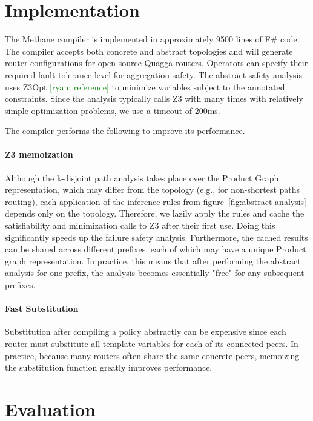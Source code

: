 \documentclass{sig-alternate-10pt}
\newcommand{\ryan}[1]{\textcolor{green}{[ryan: #1]}}
\newcommand{\sysname}{{\small \sf Methane}\xspace}
\newcommand{\para}[1]{\paragraph*{\textbf{#1}}}
\begin{document}
\section{Implementation}
\label{sec:implementation}

The \sysname compiler is implemented in approximately 9500 lines of F\# code. The compiler accepts both concrete and abstract topologies and will generate router configurations for open-source Quagga routers. Operators can specify their required fault tolerance level for aggregation safety. The abstract safety analysis uses Z3Opt \ryan{reference} to minimize variables subject to the annotated constraints. Since the analysis typically calls Z3 with many times with relatively simple optimization problems, we use a timeout of 200ms.

The compiler performs the following to improve its performance.

\para{Z3 memoization}

Although the k-disjoint path analysis takes place over the Product Graph representation, which may differ from the topology (e.g., for non-shortest paths routing), each application of the inference rules from figure~\ref{fig:abstract-analysis} depends only on the topology. Therefore, we lazily apply the rules and cache the satisfiability and minimization calls to Z3 after their first use. Doing this significantly speeds up the failure safety analysis. Furthermore, the cached results can be shared across different prefixes, each of which may have a unique Product graph representation. In practice, this means that after performing the abstract analysis for one prefix, the analysis becomes essentially "free" for any subsequent prefixes.

\para{Fast Substitution}

Substitution after compiling a policy abstractly can be expensive since each router must substitute all template variables for each of its connected peers. In practice, because many routers often share the same concrete peers, memoizing the substitution function greatly improves performance.


%
%
%
%


\section{Evaluation}
\label{sec:evaluation}
\end{document}
